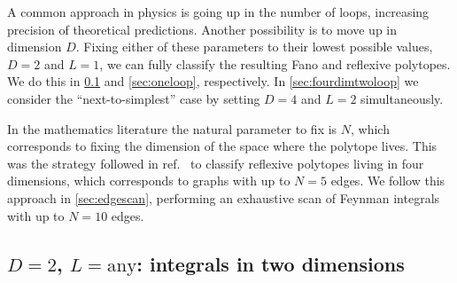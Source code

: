 \documentclass[12pt,a4paper]{article}
\theoremstyle{plain}
\theoremstyle{remark}
\newcommand{\nprops}{N}
\begin{document}
 A common approach in physics is going up in the number of
 loops, increasing precision of theoretical predictions.
 Another possibility is to move up in dimension $D$.
 Fixing either of these parameters to their lowest possible values, $D=2$ and $L=1$, we can fully classify the resulting Fano and reflexive polytopes.
 We do this in \cref{sec:twodim} and \cref{sec:oneloop}, respectively.
 In \cref{sec:fourdimtwoloop} we consider the ``next-to-simplest'' case by setting $D=4$ and $L=2$ simultaneously.
 
 In the mathematics literature the natural parameter to fix is $\nprops$, which corresponds to fixing the dimension of the space where the polytope lives.
 This was the strategy followed in ref.~\cite{Kreuzer:2000xy} to classify reflexive
 polytopes living in four dimensions, which corresponds
 to graphs with up to $\nprops=5$ edges.  
 We follow this approach in \cref{sec:edgescan}, performing an exhaustive scan of Feynman integrals with up to $\nprops=10$ edges.
	
\subsection{$D=2$, $L=\mathrm{any}$: integrals in two dimensions}%
\label{sec:twodim}
\end{document}
